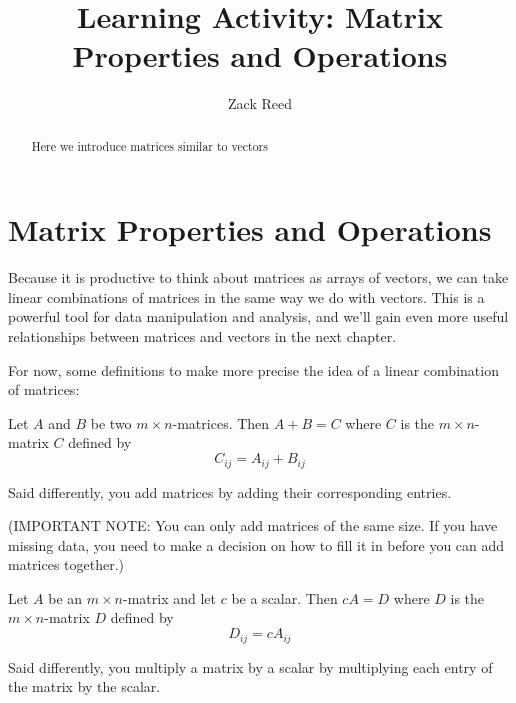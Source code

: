 \documentclass{ximera}
\author{Zack Reed} %
\title{Learning Activity: Matrix Properties and Operations}
\begin{document}
\begin{abstract}
Here we introduce matrices similar to vectors
\end{abstract}
\maketitle
 
\section*{Matrix Properties and Operations}

\begin{remark}

  Because it is productive to think about matrices as arrays of vectors, we can take linear combinations of matrices in the same way we do with vectors. This is a powerful tool for data manipulation and analysis, and we'll gain even more useful relationships between matrices and vectors in the next chapter.

  For now, some definitions to make more precise the idea of a linear combination of matrices:

  \begin{definition}
    Let $A$ and $B$ be two
    $m\times n$-matrices. Then $A+B=C$%
     where $C$ is the $m\times n$-matrix
    $C$ defined by
    \begin{equation*}
      C_{ij}=A_{ij}+B_{ij}
    \end{equation*}

    Said differently, you add matrices by adding their corresponding entries.

    (IMPORTANT NOTE: You can only add matrices of the same size. If you have missing data, you need to make a decision on how to fill it in before you can add matrices together.)
  \end{definition}

  \begin{definition}
    Let $A$ be an $m\times n$-matrix and let $c$ be a scalar. Then $cA=D$%
     where $D$ is the $m\times n$-matrix
    $D$ defined by
    \begin{equation*}
      D_{ij}=cA_{ij}
    \end{equation*}

    Said differently, you multiply a matrix by a scalar by multiplying each entry of the matrix by the scalar.
  \end{definition}

\end{remark}
\end{document}
